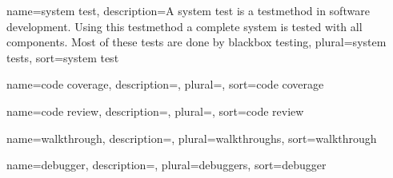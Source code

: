{
	name={system test},
	description={A system test is a testmethod in software development.
		Using this testmethod a complete system is tested with all
		components. Most of these tests are done by
		\gls{blackbox testing}},
	plural={system tests},
	sort={system test}
}

{
	name={code coverage},
	description={},
	plural=,
	sort={code coverage}
}

{
	name={code review},
	description={},
	plural=,
	sort={code review}
}

{
	name=walkthrough,
	description={},
	plural=walkthroughs,
	sort=walkthrough
}

{
	name=debugger,
	description={},
	plural=debuggers,
	sort=debugger
}

